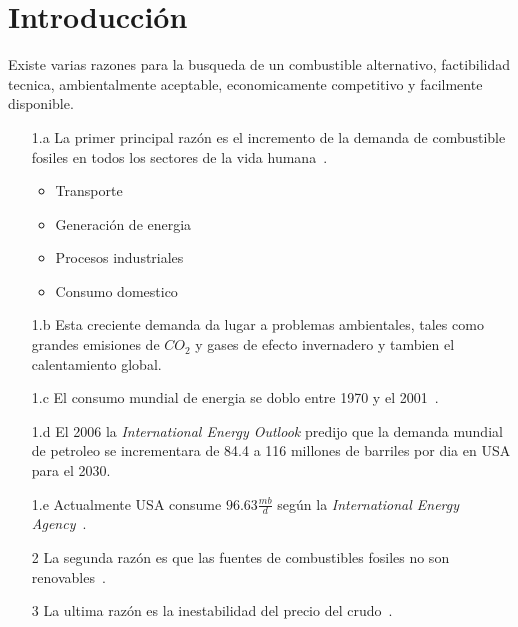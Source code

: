 \documentclass[a4paper,10pt]{article}
\begin{document}
\section{Introducción}
Existe varias razones para la busqueda de un combustible alternativo, factibilidad tecnica,
 ambientalmente aceptable, economicamente competitivo y facilmente disponible.
\begin{itemize}
 \item[1.a] La primer principal razón  es el incremento de la demanda de combustible fosiles en todos los sectores de la vida humana~\cite{Kafuku2010}.
    \begin{itemize}
	  \item Transporte
	  \item Generación de energia
	  \item Procesos industriales
	  \item Consumo domestico
    \end{itemize}
 \item[1.b] Esta creciente demanda da lugar a problemas ambientales, tales como grandes 
  emisiones de $CO_2$ y gases de efecto invernadero y tambien el calentamiento global.
 \item[1.c] El consumo mundial de energia se doblo entre 1970 y el 2001~\cite{talebian2013}.
 \item[1.d] El 2006 la \emph{International Energy Outlook} predijo que la demanda mundial de petroleo 
  se incrementara de 84.4 a 116 millones de barriles por dia en USA para el 2030.
 \item[1.e] Actualmente USA consume $96.63\frac{mb}{d}$ según la \emph{International Energy Agency}~\cite{iea2017}.
 \item[2] La segunda razón es que las fuentes de combustibles fosiles no son renovables~\cite{maceiras2011}. %
 \item[3] La ultima razón es la inestabilidad del precio del crudo~\cite{santori2012}. %
\end{itemize}
\end{document}
